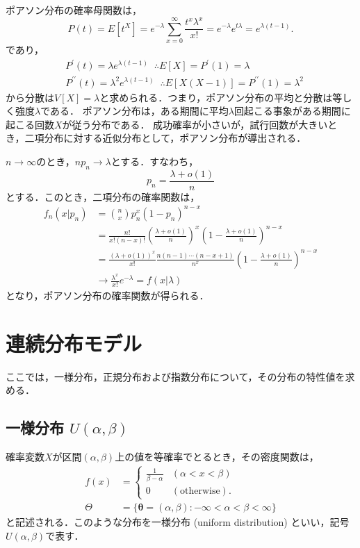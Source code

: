 \documentclass{jsreport}
\begin{document}
ポアソン分布の確率母関数は，
\begin{equation}
  P(t) = E[t^X] = e^{-\lambda} \sum_{x = 0}^{\infty} \frac{t^x \lambda^x}{x!} = e^{-\lambda}e^{t\lambda} = e^{\lambda(t - 1)}. \nonumber
\end{equation}
であり，
\begin{align}
  &P^{\prime}(t) = \lambda e^{\lambda(t - 1)} \; \; \therefore E[X] = P^{\prime}(1) = \lambda \nonumber \\
  &P^{\prime \prime}(t) = \lambda^2 e^{\lambda(t - 1)} \; \; \therefore E[X(X - 1)] = P^{\prime \prime}(1) = \lambda^2 \nonumber
\end{align}
から分散は$V[X] = \lambda$と求められる．つまり，ポアソン分布の平均と分散は等しく強度$\lambda$である．
ポアソン分布は，ある期間に平均$\lambda$回起こる事象がある期間に起こる回数$X$が従う分布である．
成功確率が小さいが，試行回数が大きいとき，二項分布に対する近似分布として，ポアソン分布が導出される．

$n \to \infty$のとき，$n p_n \to \lambda$とする．すなわち，
\begin{equation}
  p_n = \frac{\lambda + o(1)}{n} \nonumber
\end{equation}
とする．このとき，二項分布の確率関数は，
\begin{align}
  f_n(x | p_n) &= \binom{n}{x} p_n^x (1 - p_n)^{n - x} \nonumber \\
  &= \frac{n!}{x! (n - x)!} \left(\frac{\lambda + o(1)}{n}\right)^x \left(1 - \frac{\lambda + o(1)}{n}\right)^{n - x} \nonumber \\
  &= \frac{(\lambda + o(1))^x}{x!} \frac{n(n-1)\cdots(n - x + 1)}{n^x} \left(1 - \frac{\lambda + o(1)}{n}\right)^{n - x} \nonumber \\
  &\to \frac{\lambda^x}{x!} e^{-\lambda} = f(x| \lambda) \nonumber
\end{align}
となり，ポアソン分布の確率関数が得られる．

\section{連続分布モデル}
ここでは，一様分布，正規分布および指数分布について，その分布の特性値を求める．
\subsection{一様分布 $U(\alpha, \beta)$}
確率変数$X$が区間$(\alpha, \beta)$上の値を等確率でとるとき，その密度関数は，
\begin{align}
  f(x) &= \begin{cases}
    \frac{1}{\beta - \alpha} & (\alpha < x < \beta) \\
    0 & (\mbox{otherwise}).
\end{cases}\nonumber \\
\Theta &= \{\bm{\theta} = (\alpha, \beta) : -\infty < \alpha < \beta < \infty\} \nonumber
\end{align}
と記述される．このような分布を一様分布 (uniform distribution) といい，記号$U(\alpha, \beta)$で表す．
\end{document}
